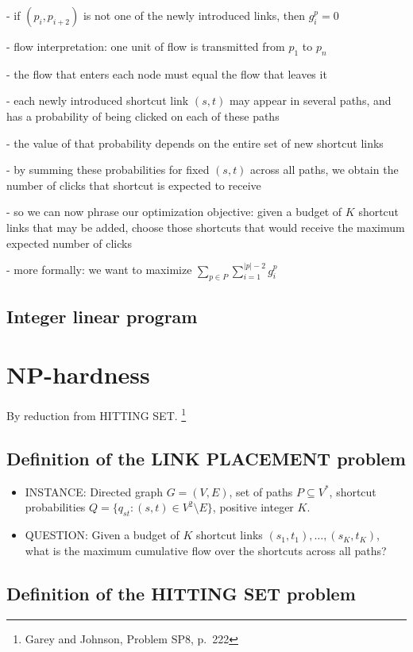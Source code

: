 \documentclass[12pt,letterpaper]{article}
\begin{document}
- if $(p_i,p_{i+2})$ is not one of the newly introduced links, then $g^p_i=0$

- flow interpretation: one unit of flow is transmitted from $p_1$ to $p_n$

- the flow that enters each node must equal the flow that leaves it

- each newly introduced shortcut link $(s,t)$ may appear in several paths, and has a probability of being clicked on each of these paths

- the value of that probability depends on the entire set of new shortcut links

- by summing these probabilities for fixed $(s,t)$ across all paths, we obtain the number of clicks that shortcut is expected to receive

- so we can now phrase our optimization objective: given a budget of $K$ shortcut links that may be added, choose those shortcuts that would receive the maximum expected number of clicks

- more formally: we want to maximize $\sum_{p \in P} \sum_{i=1}^{|p|-2} g^p_i$

\subsection{Integer linear program}


\section{NP-hardness}

By reduction from HITTING SET.%
\footnote{Garey and Johnson, Problem SP8, p.~222}

\subsection{Definition of the LINK PLACEMENT problem}

\begin{itemize}
\item INSTANCE: Directed graph $G=(V,E)$, set of paths $P \subseteq V^*$, shortcut probabilities $Q=\{q_{st} : (s,t) \in V^2 \setminus E\}$, positive integer $K$.
\item QUESTION: Given a budget of $K$ shortcut links $(s_1,t_1), \dots, (s_K,t_K)$, what is the maximum cumulative flow over the shortcuts across all paths?
\end{itemize}

\subsection{Definition of the HITTING SET problem}
\end{document}
